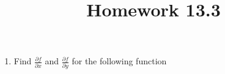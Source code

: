 \documentclass[12 pt]{article}
\title{Homework 13.3}
\begin{document}
\maketitle

\begin{enumerate}
    \item Find $\frac{\partial f}{\partial x}$ and $\frac{\partial f}{\partial y}$ for the following function
\end{enumerate}
\end{document}
